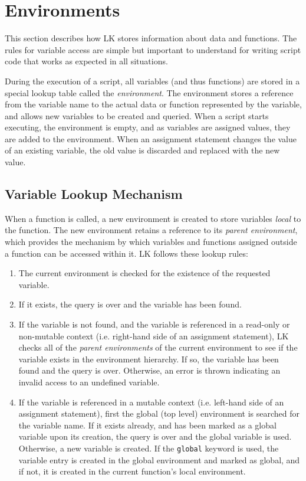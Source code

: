 \documentclass{article}
\begin{document}
\section{Environments}

This section describes how LK stores information about data and functions.  The rules for variable access are simple but important to understand for writing script code that works as expected in all situations.

During the execution of a script, all variables (and thus functions) are stored in a special lookup table called the \emph{environment}.  The environment stores a reference from the variable name to the actual data or function represented by the variable, and allows new variables to be created and queried.  When a script starts executing, the environment is empty, and as variables are assigned values, they are added to the environment.  When an assignment statement changes the value of an existing variable, the old value is discarded and replaced with the new value.

\subsection{Variable Lookup Mechanism}
When a function is called, a new environment is created to store variables \emph{local} to the function.  The new environment retains a reference to its \emph{parent environment}, which provides the mechanism by which variables and functions assigned outside a function can be accessed within it.  LK follows these lookup rules:

\begin{enumerate}
\item The current environment is checked for the existence of the requested variable.
\item If it exists, the query is over and the variable has been found.
\item If the variable is not found, and the variable is referenced in a read-only or non-mutable context (i.e. right-hand side of an assignment statement), LK checks all of the \emph{parent environments} of the current environment to see if the variable exists in the environment hierarchy.  If so, the variable has been found and the query is over. Otherwise, an error is thrown indicating an invalid access to an undefined variable.
\item If the variable is referenced in a mutable context (i.e. left-hand side of an assignment statement), first the global (top level) environment is searched for the variable name.  If it exists already, and has been marked as a global variable upon its creation, the query is over and the global variable is used.  Otherwise, a new variable is created.  If the \texttt{global} keyword is used, the variable entry is created in the global environment and marked as global, and if not, it is created in the current function's local environment.
\end{enumerate}
\end{document}
